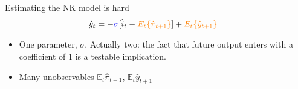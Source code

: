 \documentclass[11pt,aspectratio=169,xcolor={dvipsnames},hyperref={pdftex,pdfpagemode=UseNone,hidelinks,pdfdisplaydoctitle=true},usepdftitle=false]{beamer}
\begin{document}
\begin{frame}{Estimating the NK model is hard}
\begin{align}
\hat{y}_t &=-{\color{blue}{\sigma}}[\hat{i}_t-{\color{orange}{E_t\{\hat{\pi}_{t+1}\}}}]+{\color{orange}{E_t\{\hat{y}_{t+1}}\}}
\end{align}
\begin{itemize}
\item One parameter, $\sigma$. Actually two: the fact that future output enters with a coefficient of 1 is a testable implication.
\item Many unobservables $\mathbb{E}_t \hat{\pi}_{t+1}$, $\mathbb{E}_t \hat{y}_{t+1}$
\end{itemize}
\end{frame}
\end{document}
